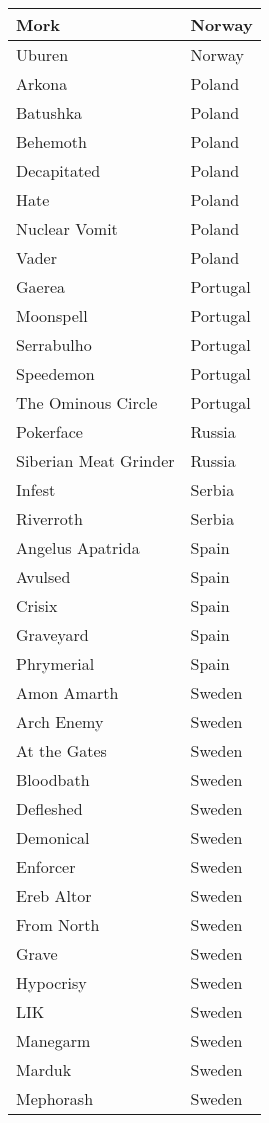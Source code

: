 \documentclass[12pt, a4paper, twoside]{report}
\begin{document}
\begin{center}
\begin{longtable}{|p{5cm}|p{5cm}|}
Mork & Norway \\ \hline
Uburen & Norway \\ \hline
Arkona & Poland \\ \hline
Batushka & Poland \\ \hline
Behemoth & Poland \\ \hline
Decapitated & Poland \\ \hline
Hate & Poland \\ \hline
Nuclear Vomit & Poland \\ \hline
Vader & Poland \\ \hline
Gaerea & Portugal \\ \hline
Moonspell & Portugal \\ \hline
Serrabulho & Portugal \\ \hline
Speedemon & Portugal \\ \hline
The Ominous Circle & Portugal \\ \hline
Pokerface & Russia \\ \hline
Siberian Meat Grinder & Russia \\ \hline
Infest & Serbia \\ \hline
Riverroth & Serbia \\ \hline
Angelus Apatrida & Spain \\ \hline
Avulsed & Spain \\ \hline
Crisix & Spain \\ \hline
Graveyard & Spain \\ \hline
Phrymerial & Spain \\ \hline
Amon Amarth & Sweden \\ \hline
Arch Enemy & Sweden \\ \hline
At the Gates & Sweden \\ \hline
Bloodbath & Sweden \\ \hline
Defleshed & Sweden \\ \hline
Demonical & Sweden \\ \hline
Enforcer & Sweden \\ \hline
Ereb Altor & Sweden \\ \hline
From North & Sweden \\ \hline
Grave & Sweden \\ \hline
Hypocrisy & Sweden \\ \hline
LIK & Sweden \\ \hline
Manegarm & Sweden \\ \hline
Marduk & Sweden \\ \hline
Mephorash & Sweden \\ \hline

\end{longtable}
\end{center}
\end{document}

